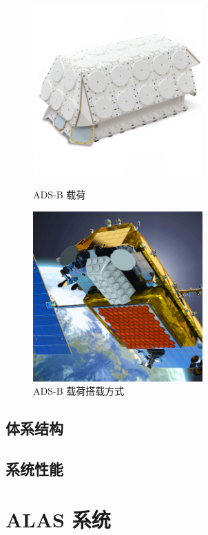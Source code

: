 \begin{figure}[htbp]
\centering
\begin{minipage}[t]{0.48\textwidth}
\centering
\includegraphics[width=6.5cm]{pic/Appstar_with_Base_2000x2000.jpg}
\caption{ADS-B 载荷}
\label{fig:Appstar_with_Base}
\end{minipage}
\begin{minipage}[t]{0.48\textwidth}
\centering
\includegraphics[width=6.5cm]{pic/reconfigurable_multimission_payloads_v2_web.jpg}
\caption{ADS-B 载荷搭载方式}
\label{fig:reconfigurable_multimission_payloads}
\end{minipage}
\end{figure}

\subsection{体系结构}

\subsection{系统性能}

\section{ALAS 系统}

